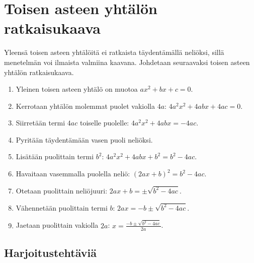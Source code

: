 \chapter{Toisen asteen yhtälön ratkaisukaava}

Yleensä toisen asteen yhtälöitä ei ratkaista täydentämällä neliöksi, sillä menetelmän voi ilmaista valmiina kaavana.
Johdetaan seuraavaksi toisen asteen yhtälön ratkaisukaava.

\begin{enumerate}
    \item Yleinen toisen asteen yhtälö on muotoa $ax^2+bx+c=0$.
    \item Kerrotaan yhtälön molemmat puolet vakiolla $4a$: $4a^2x^2+4abx+4ac=0$.
    \item Siirretään termi $4ac$ toiselle puolelle: $4a^2x^2+4abx=-4ac$.
    \item Pyritään täydentämään vasen puoli neliöksi.
    \item Lisätään puolittain termi $b^2$: $4a^2x^2+4abx+b^2=b^2-4ac$.
    \item Havaitaan vasemmalla puolella neliö: $(2ax+b)^2=b^2-4ac$.
    \item Otetaan puolittain neliöjuuri: $2ax+b=\pm\sqrt{b^2-4ac}$.
    \item Vähennetään puolittain termi $b$: $2ax=-b\pm\sqrt{b^2-4ac}$.
    \item Jaetaan puolittain vakiolla $2a$: $x=\frac{-b\pm\sqrt{b^2-4ac}}{2a}$.
\end{enumerate}

\section{Harjoitustehtäviä}
